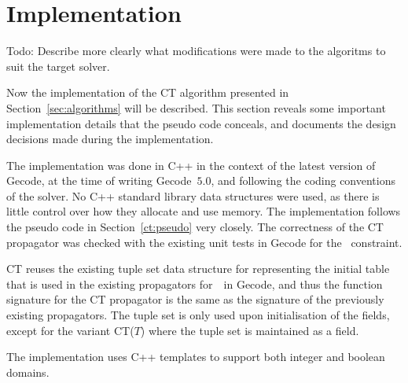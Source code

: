 \documentclass[a4paper,11pt]{article}
\newcommand{\Todo}[1]{{\color{blue}#1}}
\newcommand{\Secref}[1]{Section~\ref{#1}}
\newcommand{\Table}{\Constraint{Table}}
\newcommand{\Supports}{\texttt{supports}}
\numberwithin{equation}{section}
\begin{document}
\section{Implementation}
\label{sec:implementation}

\Todo{Todo: Describe more clearly what modifications were made to the algoritms
  to suit the target solver.}

Now the implementation of the CT algorithm presented in 
\Secref{sec:algorithms} will be described.
This section reveals some important implementation details
that the pseudo code conceals, and documents the design decisions made during
the implementation.

The implementation was done in C++ in the context of the latest version of Gecode,
at the time of writing Gecode~$5.0$, and following the coding conventions of
the solver.
No C++ standard library data structures
were used, as there is little control over how they allocate and use memory.
The implementation follows the pseudo code in \Secref{ct:pseudo} very closely.
The correctness of the CT propagator was checked with the existing unit tests
in Gecode for the \Table~constraint.

CT reuses the existing tuple set data structure for representing the initial table
that is used in the existing propagators for~\Table~in Gecode, and thus the function
signature for the CT propagator is the same as the signature of the previously
existing propagators. The tuple set
is only used upon initialisation of the fields, except for the variant CT($T$) where
the tuple set is maintained as a field.

The implementation uses C++ templates to support both integer and boolean domains.


\end{document}
